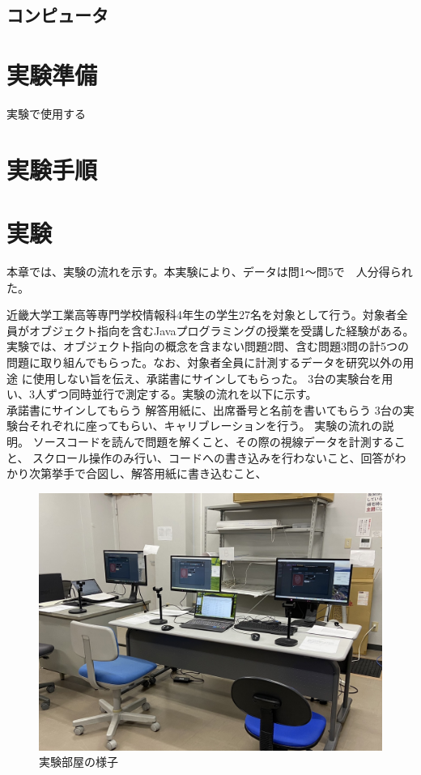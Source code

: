 \documentclass[paper=a4paper,fontsize=10pt]{jlreq}
\begin{document}
    \subsection{コンピュータ}
      
  
  \section{実験準備}
    実験で使用する
  
  \section{実験手順}


  \section{実験}
    本章では、実験の流れを示す。本実験により、データは問1～問5で　人分得られた。

    近畿大学工業高等専門学校情報科4年生の学生27名を対象として行う。対象者全員がオブジェクト指向を含むJavaプログラミングの授業を受講した経験がある。\\
    実験では、オブジェクト指向の概念を含まない問題2問、含む問題3問の計5つの問題に取り組んでもらった。なお、対象者全員に計測するデータを研究以外の用途
    に使用しない旨を伝え、承諾書にサインしてもらった。
    3台の実験台を用い、3人ずつ同時並行で測定する。実験の流れを以下に示す。\\
    
    承諾書にサインしてもらう
    解答用紙に、出席番号と名前を書いてもらう
    3台の実験台それぞれに座ってもらい、キャリブレーションを行う。
    実験の流れの説明。
    ソースコードを読んで問題を解くこと、その際の視線データを計測すること、
    スクロール操作のみ行い、コードへの書き込みを行わないこと、回答がわかり次第挙手で合図し、解答用紙に書き込むこと、


    \begin{figure}[htbp]
      \centering
      \includegraphics[width=0.8\linewidth]{実験部屋.jpg}
      \caption{実験部屋の様子}
    \end{figure}
\end{document}
